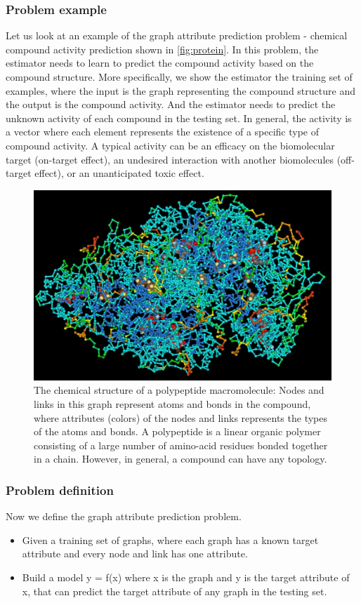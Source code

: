 \documentclass{article}
\begin{document}
\subsubsection{Problem example}
Let us look at an example of the graph attribute prediction problem
- chemical compound activity prediction shown in \autoref{fig:protein}.
In this problem, the estimator needs to learn to predict the compound activity
based on the compound structure.
More specifically, we show the estimator the training set of examples,
where the input is the graph representing the compound structure and
the output is the compound activity.
And the estimator needs to predict the unknown activity of each compound
in the testing set.
In general, the activity is a vector where each element represents
the existence of a specific type of compound activity.
A typical activity can be
an efficacy on the biomolecular target (on-target effect),
an undesired interaction with another biomolecules (off-target effect),
or an unanticipated toxic effect.
\begin{figure}[!htb]\centering
	\includegraphics[width=\textwidth]{ProteinStructure}
	\caption{
		The chemical structure of a polypeptide macromolecule:
		Nodes and links in this graph represent atoms and bonds in the compound,
		where attributes (colors) of the nodes and links represents
		the types of the atoms and bonds.
		A polypeptide is a linear organic polymer consisting of a large number of amino-acid residues bonded together in a chain.
		However, in general, a compound can have any topology.
	}
	\label{fig:protein}
\end{figure}

\subsubsection{Problem definition}
Now we define the graph attribute prediction problem.
\begin{itemize}
	\item Given a training set of graphs, where each graph has a known target attribute and every node and link has one attribute.
	\item Build a model y = f(x) where x is the graph and y is the target attribute of x,
	that can predict the target attribute of any graph in the testing set.
\end{itemize}
\end{document}
